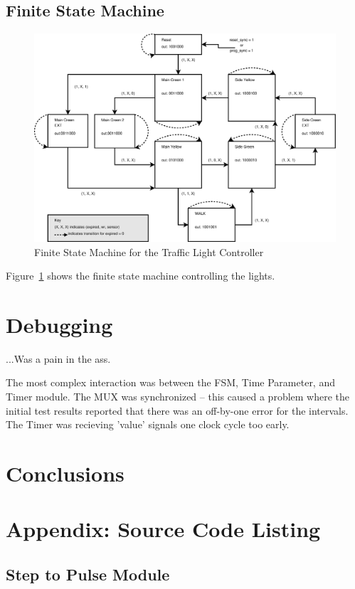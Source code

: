 \documentclass{article}
\begin{document}
	\subsection{Finite State Machine}
		\begin{center}
		\begin{figure}
		\centering
		\includegraphics{fsm.ps}
		\caption{Finite State Machine for the Traffic Light Controller}
		\label{fig:fsm}
		\end{figure}
		\end{center}
		Figure~\ref{fig:fsm} shows the finite state machine controlling
		the lights.

\section{Debugging}
	...Was a pain in the ass.

	The most complex interaction was between the FSM, Time Parameter, and
	Timer module.  The MUX was synchronized -- this caused a problem where
	the initial test results reported that there was an off-by-one error
	for the intervals.  The Timer was recieving 'value' signals one clock
	cycle too early.

\section{Conclusions}

\newpage
\section{Appendix: Source Code Listing}
	\subsection{Step to Pulse Module}
		\begin{lgrind}
		
		\end{lgrind}
\end{document}
